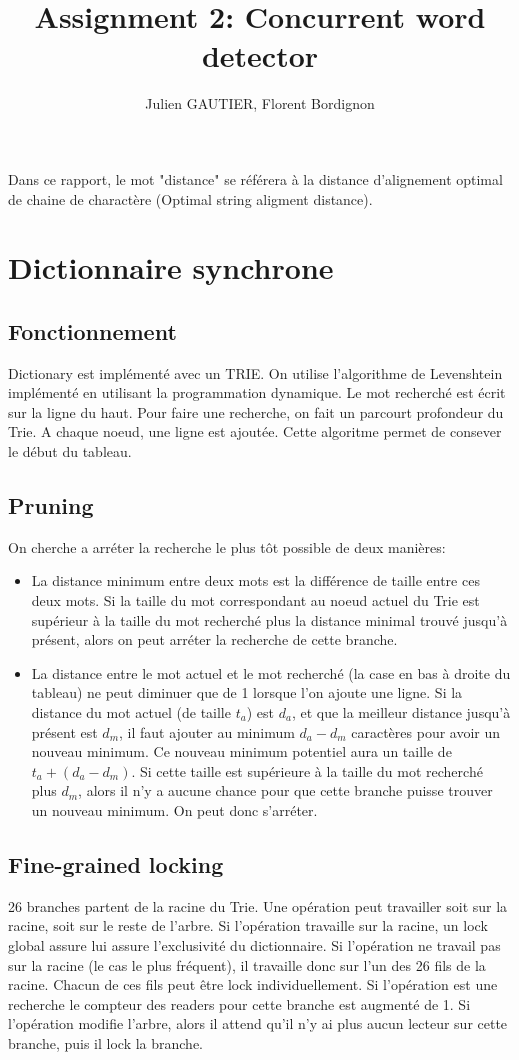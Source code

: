 \documentclass{article}
\title{Assignment 2: Concurrent word detector}
\author{Julien GAUTIER, Florent Bordignon}
\begin{document}
\maketitle
Dans ce rapport, le mot "distance" se référera à la distance d'alignement optimal de chaine de charactère (Optimal string aligment distance).

\section{Dictionnaire synchrone}
\subsection{Fonctionnement}
Dictionary est implémenté avec un TRIE. On utilise l'algorithme de Levenshtein implémenté en utilisant la programmation dynamique. Le mot recherché est écrit sur la ligne du haut. Pour faire une recherche, on fait un parcourt profondeur du Trie. A chaque noeud, une ligne est ajoutée. Cette algoritme permet de consever le début du tableau.

\subsection{Pruning}
On cherche a arréter la recherche le plus tôt possible de deux manières:
\begin{itemize}
\item La distance minimum entre deux mots est la différence de taille entre ces deux mots. Si la taille du mot correspondant au noeud actuel du Trie est supérieur à la taille du mot recherché plus la distance minimal trouvé jusqu'à présent, alors on peut arréter la recherche de cette branche.
\item La distance entre le mot actuel et le mot recherché (la case en bas à droite du tableau) ne peut diminuer que de 1 lorsque l'on ajoute une ligne. Si la distance du mot actuel (de taille $t_a$) est $d_a$, et que la meilleur distance jusqu'à présent est $d_m$, il faut ajouter au minimum $d_a - d_m$ caractères pour avoir un nouveau minimum. Ce nouveau minimum potentiel aura un taille de $t_a + (d_a - d_m)$. Si cette taille est supérieure à la taille du mot recherché plus $d_m$, alors il n'y a aucune chance pour que cette branche puisse trouver un nouveau minimum. On peut donc s'arréter.
\end{itemize}
\subsection{Fine-grained locking}
26 branches partent de la racine du Trie. Une opération peut travailler soit sur la racine, soit sur le reste de l'arbre. Si l'opération travaille sur la racine, un lock global assure lui assure l'exclusivité du dictionnaire.
Si l'opération ne travail pas sur la racine (le cas le plus fréquent), il travaille donc sur l'un des 26 fils de la racine. Chacun de ces fils peut être lock individuellement. Si l'opération est une recherche le compteur des readers pour cette branche est augmenté de 1. Si l'opération modifie l'arbre, alors il attend qu'il n'y ai plus aucun lecteur sur cette branche, puis il lock la branche.
\end{document}
